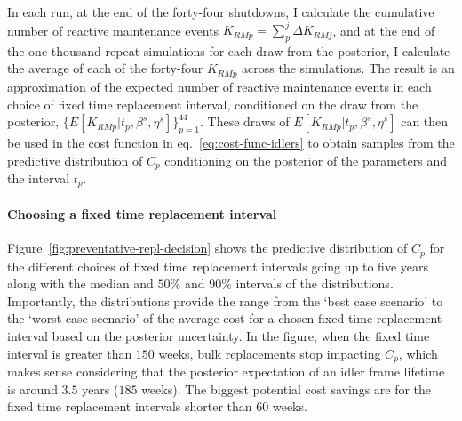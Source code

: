 In each run, at the end of the forty-four shutdowns, I calculate the cumulative number of reactive maintenance events $K_{RM p} = \sum_{p}^{j} \Delta K_{RM j}$, and at the end of the one-thousand repeat simulations for each draw from the posterior, I calculate the average of each of the forty-four $K_{RM p}$ across the simulations. The result is an approximation of the expected number of reactive maintenance events in each choice of fixed time replacement interval, conditioned on the draw from the posterior, $\{E[K_{RM p}|t_p,\beta^s,\eta^s]\}^{44}_{p = 1}$. These draws of $E[K_{RM p}|t_p,\beta^s,\eta^s]$ can then be used in the cost function in eq.~\eqref{eq:cost-func-idlers} to obtain samples from the predictive distribution of $C_p$ conditioning on the posterior of the parameters and the interval $t_p$.

\paragraph*{Choosing a fixed time replacement interval}

Figure~\ref{fig:preventative-repl-decision} shows the predictive distribution of $C_p$ for the different choices of fixed time replacement intervals going up to five years along with the median and $50\%$ and $90\%$ intervals of the distributions. Importantly, the distributions provide the range from the `best case scenario' to the `worst case scenario' of the average cost for a chosen fixed time replacement interval based on the posterior uncertainty. In the figure, when the fixed time interval is greater than $150$ weeks, bulk replacements stop impacting $C_p$, which makes sense considering that the posterior expectation of an idler frame lifetime is around $3.5$ years ($185$ weeks). The biggest potential cost savings are for the fixed time replacement intervals shorter than $60$ weeks.

